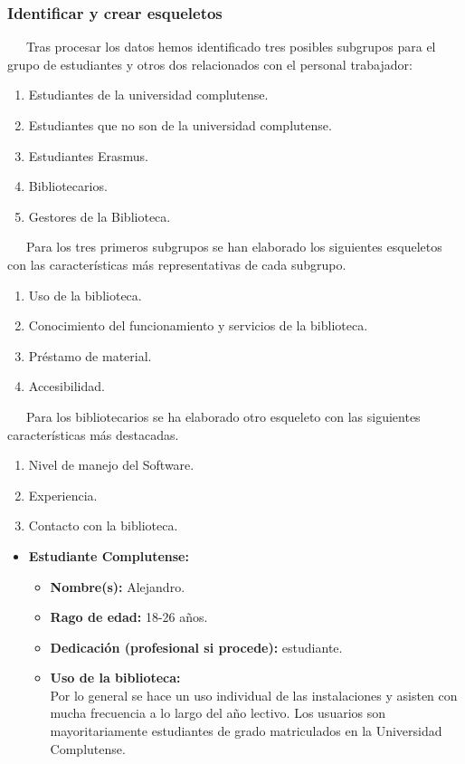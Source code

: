 \documentclass[12pt]{article}
\begin{document}
\begin{itemize}
\subsubsection{Identificar y crear esqueletos}

~~~Tras procesar los datos hemos identificado tres posibles subgrupos para el grupo de estudiantes y otros dos relacionados con el personal trabajador:
\begin{enumerate}
	\item Estudiantes de la universidad complutense.
	\item Estudiantes que no son de la universidad complutense.
	\item Estudiantes Erasmus.
	\item Bibliotecarios.
	\item Gestores de la Biblioteca.
\end{enumerate}

~~~Para los tres primeros subgrupos se han elaborado los siguientes esqueletos con las características más representativas de cada subgrupo.

\begin{enumerate}
	\item Uso de la biblioteca.
	\item Conocimiento del funcionamiento y servicios de la biblioteca.
	\item Préstamo de material.
	\item Accesibilidad.
\end{enumerate}

~~~Para los bibliotecarios se ha elaborado otro esqueleto con las siguientes características más destacadas.

\begin{enumerate}
	\item Nivel de manejo del Software.
	\item Experiencia.
	\item Contacto con la biblioteca.
\end{enumerate}

\begin{itemize}
	\item \textbf{Estudiante Complutense: }
	\begin{itemize}
	\item \textbf{Nombre(s):}  Alejandro. \\
	\item \textbf{Rago de edad:} 18-26 años. \\
	\item \textbf{Dedicación (profesional si procede):} estudiante. \\
		\item \textbf{Uso de la biblioteca: \\}
			Por lo general se hace un uso individual de las instalaciones y asisten con mucha frecuencia a lo largo del año lectivo. Los usuarios son mayoritariamente estudiantes de grado matriculados en la Universidad Complutense.


\end{itemize}
\end{itemize}
\end{itemize}
\end{document}
